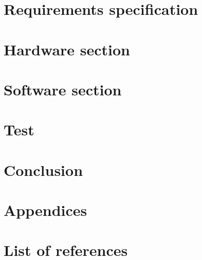 



\renewcommand\chaptername{Chapter}
\renewcommand\contentsname{Table of Contents}
\renewcommand\figurename{Figure}
\renewcommand\tablename{Table} 


\cleardoublepage

\frontmatter




\cleardoublepage

\tableofcontents*
\newpage
\printnomenclature
\renewcommand*\listfigurename{List of Figures}
\renewcommand*\listtablename{List of Tables}

\mainmatter

\chapter{Requirements specification}

\chapter{Hardware section}
%


\chapter{Software section}



\chapter{Test}

\chapter{Conclusion}

\chapter{Appendices}

\chapter{List of references}

\newpage
\listoffigures
{}
\newpage
\listoftables
{}
\newpage
\printbibliography

